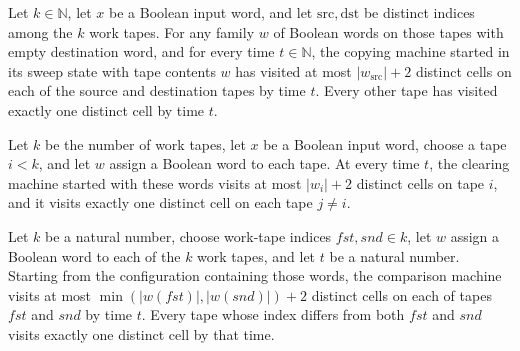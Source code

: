 \begin{theorem}
\label{Turing.copyTM_spaceUsedByTape}
\leanok
{}
Let $k\in\mathbb{N}$, let $x$ be a Boolean input word, and let
$\mathrm{src},\mathrm{dst}$ be distinct indices among the $k$ work tapes. For any family
$w$ of Boolean words on those tapes with empty destination word, and for every time
$t\in\mathbb{N}$, the copying machine started in its sweep state with tape contents $w$
has visited at most $|w_{\mathrm{src}}|+2$ distinct cells on each of the source and
destination tapes by time $t$. Every other tape has visited exactly one distinct cell by
time $t$.
\end{theorem}

\begin{theorem}
\label{Turing.clearTM_spaceUsedByTape}
\leanok
{}
Let $k$ be the number of work tapes, let $x$ be a Boolean input word, choose a tape
$i<k$, and let $w$ assign a Boolean word to each tape. At every time $t$, the clearing
machine started with these words visits at most $|w_i|+2$ distinct cells on tape $i$,
and it visits exactly one distinct cell on each tape $j\ne i$.
\end{theorem}

\begin{theorem}
\label{Turing.compareTM_spaceUsedByTape}
\leanok
{}
Let $k$ be a natural number, choose work-tape indices $fst,snd\in k$, let $w$ assign a
Boolean word to each of the $k$ work tapes, and let $t$ be a natural number. Starting
from the configuration containing those words, the comparison machine visits at most
$\min(|w(fst)|,|w(snd)|)+2$ distinct cells on each of tapes $fst$ and $snd$ by time $t$.
Every tape whose index differs from both $fst$ and $snd$ visits exactly one distinct
cell by that time.
\end{theorem}

